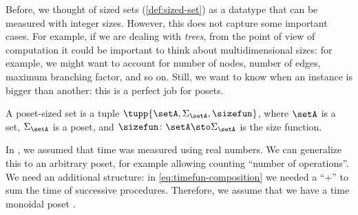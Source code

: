 Before, we thought of sized sets (\cref{def:sized-set}) as a datatype that can be measured with integer sizes.
However, this does not capture some important cases.
For example, if we are dealing with \emph{trees}, from the point of view of computation it could be important to think about multidimensional sizes: for example, we might want to account for number of nodes, number of edges, maximum branching factor, and so on.
Still, we want to know when an instance is bigger than another: this is a perfect job for posets.

\begin{definition}
    \label{def:poset-sized-set}
    A poset-sized set is a tuple $\tupp{\setA, \Sigma_{\setA}, \sizefun}$, where $\setA$ is a set, $\Sigma_\setA$ is a poset, and  $\sizefun \colon \setA \sto \Sigma_\setA$ is the size function.
\end{definition}

In \ProcSizeTime, we assumed that time was measured using real numbers.
We can generalize this to an arbitrary poset, for example allowing counting ``number of operations''.
We need an additional structure: in \vref{eq:timefun-composition} we needed a ``+'' to sum the time of successive procedures.
Therefore, we assume that we have a time monoidal poset \TimeMonoidal.

